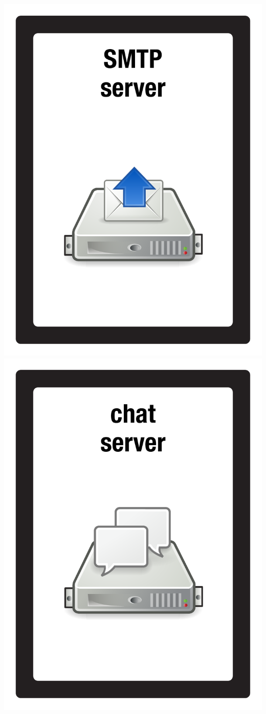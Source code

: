 \documentclass{letter}
\begin{document}
\includegraphics{patch/patch_smtp_server}
\includegraphics{patch/patch_chat_server}
\end{document}
